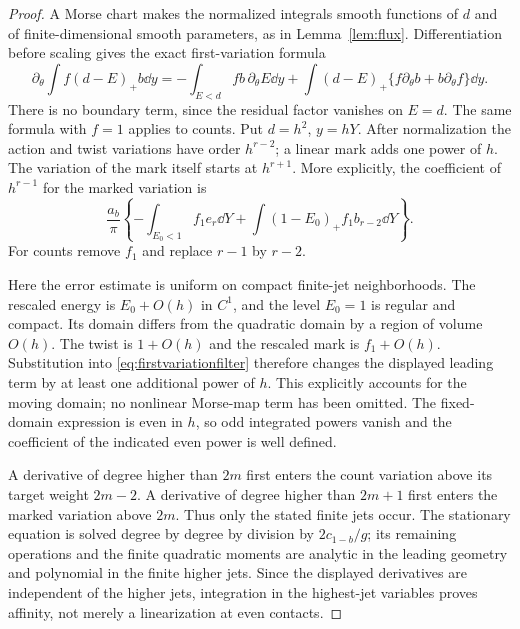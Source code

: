 \begin{proof}
A Morse chart makes the normalized integrals smooth functions of $d$
and of finite-dimensional smooth parameters, as in
Lemma~\ref{lem:flux}. Differentiation before scaling gives the exact
first-variation formula
\begin{equation}\label{eq:firstvariationfilter}
 \partial_\theta\int f(d-E)_+b\dd y
 =-\int_{E<d}f b\,\partial_\theta E\dd y
  +\int(d-E)_+\{f\partial_\theta b+b\partial_\theta f\}\dd y.
\end{equation}
There is no boundary term, since the residual factor vanishes on
$E=d$. The same formula with $f=1$ applies to counts.
Put $d=h^2$, $y=hY$. After normalization the action and twist
variations have order $h^{r-2}$; a linear mark adds one power of $h$.
The variation of the mark itself starts at $h^{r+1}$. More explicitly,
the coefficient of $h^{r-1}$ for the marked variation is
\begin{equation}\label{eq:filteredcoefficient}
 \frac{a_b}{\pi}\left\{-\int_{E_0<1}f_1e_r\dd Y
              +\int(1-E_0)_+f_1b_{r-2}\dd Y\right\}.
\end{equation}
For counts remove $f_1$ and replace $r-1$ by $r-2$.

Here the error estimate is uniform on compact finite-jet neighborhoods.
The rescaled energy is $E_0+O(h)$ in $C^1$, and the level $E_0=1$
is regular and compact. Its domain differs from the quadratic domain
by a region of volume $O(h)$. The twist is $1+O(h)$ and the rescaled
mark is $f_1+O(h)$. Substitution into
\eqref{eq:firstvariationfilter} therefore changes the displayed leading
term by at least one additional power of $h$. This explicitly accounts
for the moving domain; no nonlinear Morse-map term has been omitted.
The fixed-domain expression is even in $h$, so odd integrated powers
vanish and the coefficient of the indicated even power is well defined.

A derivative of degree higher than $2m$ first enters the count variation
above its target weight $2m-2$. A derivative of degree higher than
$2m+1$ first enters the marked variation above $2m$. Thus only the
stated finite jets occur. The stationary equation is solved degree by
degree by division by $2c_{1-b}/g$; its remaining operations and the
finite quadratic moments are analytic in the leading geometry and
polynomial in the finite higher jets. Since the displayed derivatives
are independent of the higher jets, integration in the highest-jet
variables proves affinity, not merely a linearization at even contacts.
\end{proof}

